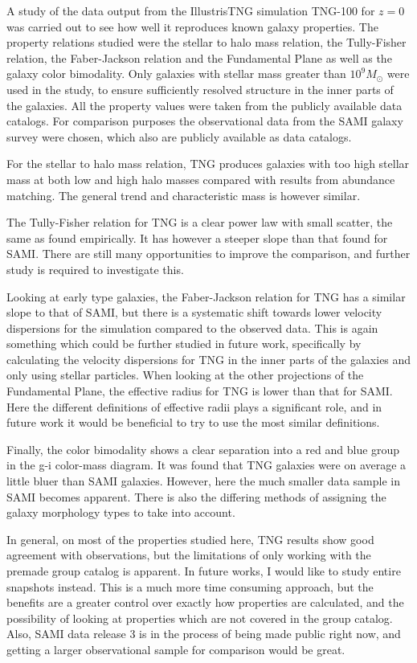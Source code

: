 
A study of the data output from the IllustrisTNG simulation TNG-100 for $z=0$ was carried out to see how well it reproduces known galaxy properties. The property relations studied were the stellar to halo mass relation, the Tully-Fisher relation, the Faber-Jackson relation and the Fundamental Plane as well as the galaxy color bimodality. Only galaxies with stellar mass greater than $10^9 M_{\odot}$ were used in the study, to ensure sufficiently resolved structure in the inner parts of the galaxies. All the property values were taken from the publicly available data catalogs. For comparison purposes the observational data from the SAMI galaxy survey were chosen, which also are publicly available as data catalogs.  

For the stellar to halo mass relation, TNG produces galaxies with too high stellar mass at both low and high halo masses compared with results from abundance matching. The general trend and characteristic mass is however similar. 

The Tully-Fisher relation for TNG is a clear power law with small scatter, the same as found empirically. It has however a steeper slope than that found for SAMI. There are still many opportunities to improve the comparison, and further study is required to investigate this. 

Looking at early type galaxies, the Faber-Jackson relation for TNG has a similar slope to that of SAMI, but there is a systematic shift towards lower velocity dispersions for the simulation compared to the observed data. This is again something which could be further studied in future work, specifically by calculating the velocity dispersions for TNG in the inner parts of the galaxies and only using stellar particles. When looking at the other projections of the Fundamental Plane, the effective radius for TNG is lower than that for SAMI. Here the different definitions of effective radii plays a significant role, and in future work it would be beneficial to try to use the most similar definitions.

Finally, the color bimodality shows a clear separation into a red and blue group in the g-i color-mass diagram. It was found that TNG galaxies were on average a little bluer than SAMI galaxies. However, here the much smaller data sample in SAMI becomes apparent. There is also the differing methods of assigning the galaxy morphology types to take into account.

In general, on most of the properties studied here, TNG results show good agreement with observations, but the limitations of only working with the premade group catalog is apparent. In future works, I would like to study entire snapshots instead. This is a much more time consuming approach, but the benefits are a greater control over exactly how properties are calculated, and the possibility of looking at properties which are not covered in the group catalog. Also, SAMI data release 3 is in the process of being made public right now, and getting a larger observational sample for comparison would be great.


